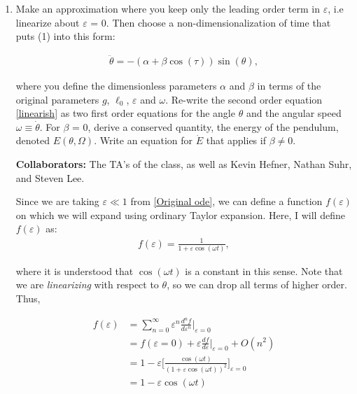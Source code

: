 \documentclass[12pt]{article}
\newcommand{\ep}{\varepsilon}
\begin{document}
\begin{enumerate}
    \item Make an approximation where you keep only the leading order term in $\ep$, i.e linearize about $\varepsilon$ = 0. Then choose a non-dimensionalization of time that puts (1) into this form:

    \begin{align}
        \ddot{\theta} = -(\alpha + \beta \cos(\tau))\sin(\theta),   \label{linearish}
    \end{align}

        where you define the dimensionless parameters $\alpha$ and $\beta$ in terms of the original parameters $g$, $\ell_0$, $\varepsilon$ and $\omega$. Re-write the second order equation \ref{linearish} as two first order equations for the angle $\theta$ and the angular speed $\omega \equiv \dot{\theta}$. For $\beta$ = 0, derive a conserved quantity, the energy of the pendulum, denoted $E(\theta, \Omega)$. Write an equation for $\dot{E}$ that applies if $\beta \neq 0$.

        {\color{cit}\vspace{2mm}\noindent\textbf{Collaborators:}} The TA's of the class, as well as Kevin Hefner, Nathan Suhr, and Steven Lee.
        \begin{solution}

        Since we are taking $\ep \ll 1$ from \ref{Original ode}, we can define a function $f(\ep)$ on which we will expand using ordinary Taylor expansion. Here, I will define $f(\ep)$ as:
        \begin{align}
            f(\ep) = \frac{1}{1 + \ep \cos(\omega t)},
        \end{align}

        where it is understood that $\cos(\omega t)$ is a constant in this sense. Note that we are \textit{linearizing} with respect to $\theta$, so we can drop all terms of higher order. Thus, 

        \begin{align}
            f(\ep) &= \sum_{n = 0}^\infty \ep^n\frac{d^nf}{d\ep^n} \Big\rvert_{\ep = 0} \nonumber \\
            &= f(\ep = 0) + \ep\frac{df}{d\ep} \Big\rvert_{\ep = 0} + O(n^2)  \nonumber \\
            &= 1 - \ep \bigg[ \frac{\cos(\omega t)}{(1 + \ep\cos(\omega t))^2} \bigg]_{\ep = 0}  \nonumber \\
            & = 1 - \ep \cos(\omega t) \label{Expansion} 
        \end{align}


\end{solution}
\end{enumerate}
\end{document}

